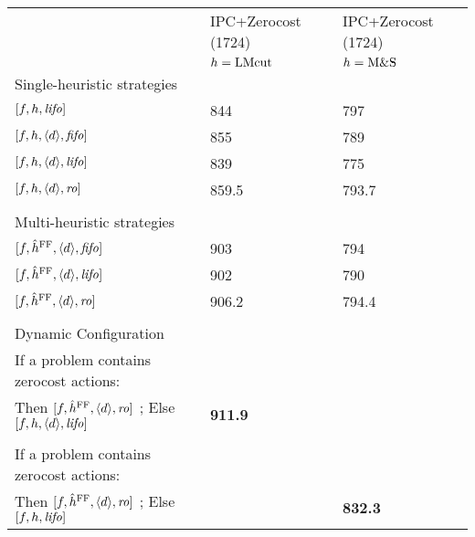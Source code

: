 \begin{center}
\begin{tabular}{|l|l|l|}
\hline
 & IPC+Zerocost (1724) & IPC+Zerocost (1724)\\
 & \(h=\text{LMcut}\) & \(h=\text{M\&S}\)\\
Single-heuristic strategies &  & \\
\([f,h,{\text{\textit{lifo}}}]\) & 844 & 797\\
\([f,h,{\left<d\right>},{\text{\textit{fifo}}}]\) & 855 & 789\\
\([f,h,{\left<d\right>},{\text{\textit{lifo}}}]\) & 839 & 775\\
\([f,h,{\left<d\right>},{\text{\textit{ro}}}]\) & 859.5 & 793.7\\
 &  & \\
Multi-heuristic strategies &  & \\
\([f,\hat{h}^{\text{FF}},{\left<d\right>},{\text{\textit{fifo}}}]\) & 903 & 794\\
\([f,\hat{h}^{\text{FF}},{\left<d\right>},{\text{\textit{lifo}}}]\) & 902 & 790\\
\([f,\hat{h}^{\text{FF}},{\left<d\right>},{\text{\textit{ro}}}]\) & 906.2 & 794.4\\
 &  & \\
Dynamic Configuration &  & \\
If a problem contains zerocost actions: &  & \\
Then \([f,\hat{h}^{\text{FF}},{\left<d\right>},{\text{\textit{ro}}}]\) ; Else \([f,h,{\left<d\right>},{\text{\textit{lifo}}}]\) & \textbf{911.9} & \\
 &  & \\
If a problem contains zerocost actions: &  & \\
Then \([f,\hat{h}^{\text{FF}},{\left<d\right>},{\text{\textit{ro}}}]\) ; Else \([f,h,{\text{\textit{lifo}}}]\) &  & \textbf{832.3}\\
\hline
\end{tabular}
\end{center}
